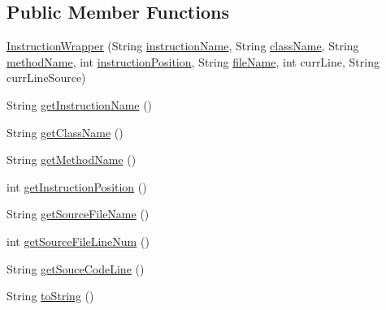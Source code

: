 \subsection*{Public Member Functions}
\begin{DoxyCompactItemize}
\item 
\hyperlink{classgov_1_1nasa_1_1jpf_1_1inspector_1_1utils_1_1_instruction_wrapper_ae3d11627c91785f7ab2822055639a42d}{Instruction\+Wrapper} (String \hyperlink{classgov_1_1nasa_1_1jpf_1_1inspector_1_1utils_1_1_instruction_wrapper_afff7ff26a868cf2a4b77abdb080e028b}{instruction\+Name}, String \hyperlink{classgov_1_1nasa_1_1jpf_1_1inspector_1_1utils_1_1_instruction_wrapper_a6838aedba2a378c7fe0df985d8fccb08}{class\+Name}, String \hyperlink{classgov_1_1nasa_1_1jpf_1_1inspector_1_1utils_1_1_instruction_wrapper_a84e975c4545e697f843a785af6dd937d}{method\+Name}, int \hyperlink{classgov_1_1nasa_1_1jpf_1_1inspector_1_1utils_1_1_instruction_wrapper_a78cea7c9d35c83e0fa1cbbc13022725d}{instruction\+Position}, String \hyperlink{classgov_1_1nasa_1_1jpf_1_1inspector_1_1utils_1_1_instruction_wrapper_ac5d8a6508abd8be72ea07f46a553ac71}{file\+Name}, int curr\+Line, String curr\+Line\+Source)
\item 
String \hyperlink{classgov_1_1nasa_1_1jpf_1_1inspector_1_1utils_1_1_instruction_wrapper_a098df554ac34fdeaf5e67b692698044b}{get\+Instruction\+Name} ()
\item 
String \hyperlink{classgov_1_1nasa_1_1jpf_1_1inspector_1_1utils_1_1_instruction_wrapper_a5c20046779e75d3191caf619a6c45798}{get\+Class\+Name} ()
\item 
String \hyperlink{classgov_1_1nasa_1_1jpf_1_1inspector_1_1utils_1_1_instruction_wrapper_a14ddf596b3124890dc6068a7dfd1e413}{get\+Method\+Name} ()
\item 
int \hyperlink{classgov_1_1nasa_1_1jpf_1_1inspector_1_1utils_1_1_instruction_wrapper_a6a0250a6e93ce88627d16437538a2a2c}{get\+Instruction\+Position} ()
\item 
String \hyperlink{classgov_1_1nasa_1_1jpf_1_1inspector_1_1utils_1_1_instruction_wrapper_ad188def5f0a2165279b26a49531ae9af}{get\+Source\+File\+Name} ()
\item 
int \hyperlink{classgov_1_1nasa_1_1jpf_1_1inspector_1_1utils_1_1_instruction_wrapper_a6a262169b9b02a5d510130423038dae4}{get\+Source\+File\+Line\+Num} ()
\item 
String \hyperlink{classgov_1_1nasa_1_1jpf_1_1inspector_1_1utils_1_1_instruction_wrapper_af50dede541c73bc503fdd3280e14f462}{get\+Souce\+Code\+Line} ()
\item 
String \hyperlink{classgov_1_1nasa_1_1jpf_1_1inspector_1_1utils_1_1_instruction_wrapper_a09aa2ded1c02ec5fbf1fe2cff5262e7a}{to\+String} ()
\end{DoxyCompactItemize}
